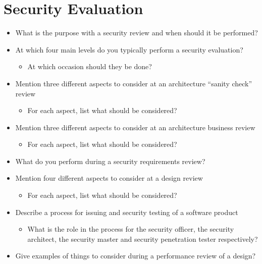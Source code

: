 \section{Security Evaluation}\label{sec:Security_Evaluation}
\begin{itemize}
\item What is the purpose with a security review and when should it be performed?
\item At which four main levels do you typically perform a security evaluation?
  \begin{itemize}[noitemsep]
  \item At which occasion should they be done?
  \end{itemize}

\item Mention three different aspects to consider at an architecture ``sanity check'' review
  \begin{itemize}[noitemsep]
  \item For each aspect, list what should be considered?
  \end{itemize}

\item Mention three different aspects to consider at an architecture business review
  \begin{itemize}[noitemsep]
  \item For each aspect, list what should be considered?
  \end{itemize}

\item What do you perform during a security requirements review?
\item Mention four different aspects to consider at a design review
  \begin{itemize}[noitemsep]
  \item For each aspect, list what should be considered?
  \end{itemize}

\item Describe a process for issuing and security testing of a software product
  \begin{itemize}[noitemsep]
  \item What is the role in the process for the security officer, the security architect, the security master and security penetration tester respectively?
  \end{itemize}

\item Give examples of things to consider during a performance review of a design?


\end{itemize}
